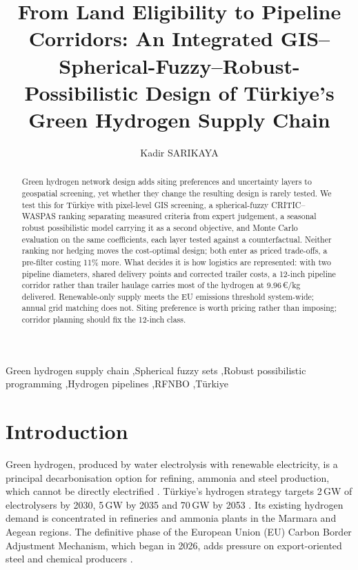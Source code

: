 \documentclass[preprint,12pt,authoryear]{elsarticle}
\begin{document}
\begin{frontmatter}

\title{From Land Eligibility to Pipeline Corridors: An Integrated GIS--Spherical-Fuzzy--Robust-Possibilistic Design of T\"urkiye's Green Hydrogen Supply Chain}

\author[1]{Kadir SARIKAYA}

\address[1]{Department of Industrial Engineering, Tokat Gaziosmanpaşa University, Tokat, Türkiye}


\begin{abstract}
Green hydrogen network design adds siting preferences and uncertainty layers to geospatial screening, yet whether they change the resulting design is rarely tested. We test this for Türkiye with pixel-level GIS screening, a spherical-fuzzy CRITIC--WASPAS ranking separating measured criteria from expert judgement, a seasonal robust possibilistic model carrying it as a second objective, and Monte Carlo evaluation on the same coefficients, each layer tested against a counterfactual. Neither ranking nor hedging moves the cost-optimal design; both enter as priced trade-offs, a pre-filter costing 11\% more. What decides it is how logistics are represented: with two pipeline diameters, shared delivery points and corrected trailer costs, a 12-inch pipeline corridor rather than trailer haulage carries most of the hydrogen at 9.96\,€/kg delivered. Renewable-only supply meets the EU emissions threshold system-wide; annual grid matching does not. Siting preference is worth pricing rather than imposing; corridor planning should fix the 12-inch class.
\end{abstract}

\begin{keyword}
Green hydrogen supply chain \sep Spherical fuzzy sets \sep Robust possibilistic programming \sep Hydrogen pipelines \sep RFNBO \sep Türkiye
\end{keyword}

\end{frontmatter}

\section{Introduction}
Green hydrogen, produced by water electrolysis with renewable electricity, is a principal decarbonisation option for refining, ammonia and steel production, which cannot be directly electrified \citep{ec2020strategy,ajanovic2024future,monteiro2023hydrogen}. Türkiye's hydrogen strategy targets 2\,GW of electrolysers by 2030, 5\,GW by 2035 and 70\,GW by 2053 \citep{menr2023hydrogen}. Its existing hydrogen demand is concentrated in refineries and ammonia plants in the Marmara and Aegean regions. The definitive phase of the European Union (EU) Carbon Border Adjustment Mechanism, which began in 2026, adds pressure on export-oriented steel and chemical producers \citep{unsp2024decarbonizing}.
\end{document}

